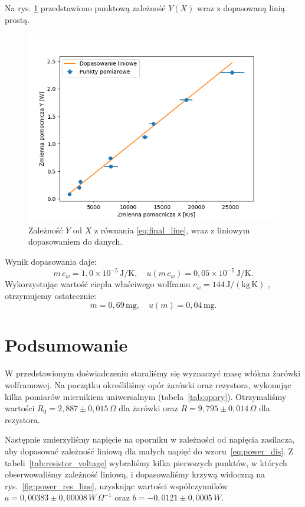 \documentclass[12pt]{article}
\begin{document}
Na rys. \ref{fig:final_graph} przedstawiono punktową zależność $Y(X)$ wraz z dopasowaną linią prostą.
\begin{figure}[H]
    \centering
    \includegraphics[scale=0.7]{final_graph}
    \caption{Zależność $Y$ od $X$ z równania \eqref{eq:final_line}, wraz z liniowym dopasowaniem do danych.}
    \label{fig:final_graph}
\end{figure}
Wynik dopasowania daje:
\[
    m\,c_w = 1{,}0\times 10^{-5}\,\mathrm{J/K}, 
    \quad
    u(m\,c_w) = 0{,}05\times 10^{-5}\,\mathrm{J/K}.
\]
Wykorzystując wartość ciepła właściwego wolframu $c_w = 144\,\mathrm{J/(kg\,K)}$ \cite{heat_capacity}, otrzymujemy ostatecznie:
\[
    m =0{,}69\,\mathrm{mg},
    \quad
    u(m) = 0{,}04\,\mathrm{mg}.
\]

\newpage

\section{Podsumowanie}
W przedstawionym doświadczeniu staraliśmy się wyznaczyć masę włókna żarówki wolframowej. Na początku określiliśmy opór żarówki oraz rezystora, wykonując kilka pomiarów miernikiem uniwersalnym (tabela~\ref{tab:opory}). Otrzymaliśmy wartości $R_{0} = 2{,}887 \pm 0{,}015\,\Omega$ dla żarówki oraz $R = 9{,}795 \pm 0{,}014\,\Omega$ dla rezystora.

Następnie zmierzyliśmy napięcie na oporniku w zależności od napięcia zasilacza, aby dopasować zależność liniową dla małych napięć do wzoru~\ref{eq:power_dis}. Z tabeli~\ref{tab:resistor_voltage} wybraliśmy kilka pierwszych punktów, w których obserwowaliśmy zależność liniową, i dopasowaliśmy krzywą widoczną na rys.~\ref{fig:power_res_line}, uzyskując wartości współczynników $a=0{,}00383 \pm 0{,}00008\,W\,\Omega^{-1}$ oraz $b=-0{,}0121 \pm 0{,}0005\,W$.
\end{document}
